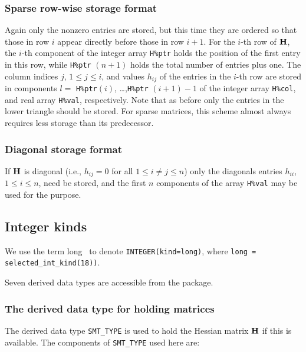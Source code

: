 \documentclass{galahad}
\begin{document}
\subsubsection{Sparse row-wise storage format}\label{rowwise}
Again only the nonzero entries are stored, but this time
they are ordered so that those in row $i$ appear directly before those
in row $i+1$. For the $i$-th row of ${\mathbf{H}}$, the $i$-th component of the
integer array {\tt H\%ptr} holds the position of the first entry in this row,
while {\tt H\%ptr} $(n+1)$ holds the total number of entries plus one.
The column indices $j$, $1 \leq j \leq i$, and values $h_{ij}$ of the
entries in the $i$-th row are stored in components
$l =$ {\tt H\%ptr}$(i)$, \ldots ,{\tt H\%ptr} $(i+1)-1$ of the
integer array {\tt H\%col}, and real array {\tt H\%val}, respectively.
Note that as before only the entries in the lower triangle should be stored.
For sparse matrices, this scheme almost always requires less storage than
its predecessor.

\subsubsection{Diagonal storage format}\label{diagonal}
If ${\mathbf{H}}$ is diagonal (i.e., $h_{ij} = 0$ for all $1 \leq i \neq j \leq n$)
only the diagonals entries $h_{ii}$, $1 \leq i \leq n$,  need be stored,
and the first $n$ components of the array {\tt H\%val} may be used for
the purpose.


\subsection{Integer kinds}\label{Integer kinds}
We use the term
long \integer\ to denote {\tt INTEGER\-(kind=long)}, where
{\tt long = selected\_int\_kind(18))}.


\galtypes
Seven derived data types are accessible from the package.


\subsubsection{The derived data type for holding matrices}\label{typesmt}
The derived data type {\tt SMT\_TYPE} is used to hold the Hessian matrix ${\mathbf{H}}$
if this is available. The components of {\tt SMT\_TYPE} used here are:
\end{document}
